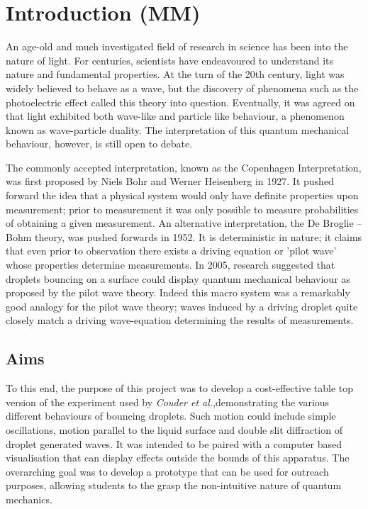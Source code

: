 \section{Introduction (MM)}
An age-old and much investigated field of research in science has been into the nature of light. For centuries, scientists have endeavoured to understand its nature and fundamental properties. At the turn of the 20th century, light was widely believed to behave as a wave, but the discovery of phenomena such as the photoelectric effect called this theory into question. Eventually, it was agreed on that light exhibited both wave-like and particle like behaviour, a phenomenon known as wave-particle duality. The interpretation of this quantum mechanical behaviour, however, is still open to debate.

The commonly accepted interpretation, known as the Copenhagen Interpretation, was first proposed by Niels Bohr and Werner Heisenberg in 1927. It pushed forward the idea that a physical system would only have definite properties upon measurement; prior to measurement it was only possible to measure probabilities of obtaining a given measurement. An alternative interpretation, the De Broglie – Bohm theory, was pushed forwards in 1952. It is deterministic in nature; it claims that even prior to observation there exists a driving equation or 'pilot wave' whose properties determine measurements. In 2005, research suggested \cite{couder} that droplets bouncing on a surface could display quantum mechanical behaviour as proposed by the pilot wave theory. Indeed this macro system was a remarkably good analogy for the pilot wave theory; waves induced by a driving droplet quite closely match a driving wave-equation determining the results of measurements. 
\subsection{Aims}
To this end, the purpose of this project was to develop a cost-effective table top version of the experiment used by \textit{Couder et al.},demonstrating the various different behaviours of bouncing droplets. Such motion could include simple oscillations, motion parallel to the liquid surface and double slit diffraction of droplet generated waves. It was intended to be paired with a computer based visualisation that can display effects outside the bounds of this apparatus. The overarching goal was to develop a prototype that can be used for outreach purposes, allowing  students to the grasp the non-intuitive nature of quantum mechanics. 

